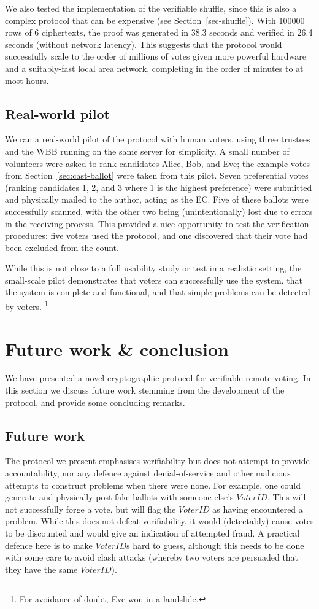 \documentclass[12pt,a4paper]{article}
\theoremstyle{definition}
\newcommand{\VoterID}{\mathit{VoterID}}
\begin{document}
We also tested the implementation of the verifiable shuffle, since this is also a complex protocol that can be expensive (see Section~\ref{sec-shuffle}). With 100000 rows of 6 ciphertexts, the proof was generated in 38.3 seconds and verified in 26.4 seconds (without network latency). This suggests that the protocol would successfully scale to the order of millions of votes given more powerful hardware and a suitably-fast local area network, completing in the order of minutes to at most hours.

\subsection{Real-world pilot}
We ran a real-world pilot of the protocol with human voters, using three trustees and the WBB running on the same server for simplicity. A small number of volunteers were asked to rank candidates Alice, Bob, and Eve; the example votes from Section~\ref{sec:cast-ballot} were taken from this pilot. Seven preferential votes (ranking candidates 1, 2, and 3 where 1 is the highest preference) were submitted and physically mailed to the author, acting as the EC. Five of these ballots were successfully scanned, with the other two being (unintentionally) lost due to errors in the receiving process. This provided a nice opportunity to test the verification procedures: five voters used the protocol, and one discovered that their vote had been excluded from the count.

While this is not close to a full usability study or test in a realistic setting, the small-scale pilot demonstrates that voters can successfully use the system, that the system is complete and functional, and that simple problems can be detected by voters.
\footnote{For avoidance of doubt, Eve won in a landslide.}
\newpage
\section{Future work \& conclusion}\label{sec-conclusion}
We have presented a novel cryptographic protocol for verifiable remote voting. In this section we discuss future work stemming from the development of the protocol, and provide some concluding remarks.
\subsection{Future work}
The protocol we present emphasises verifiability but does not attempt to provide accountability, nor any defence against denial-of-service and other malicious attempts to construct problems when there were none. For example, one could generate and physically post fake ballots with someone else's $\VoterID$. This will not successfully forge a vote, but will flag the $\VoterID$ as having encountered a problem. While this does not defeat verifiability, it would (detectably) cause votes to be discounted and would give an indication of attempted fraud. A practical defence here is to make $\VoterID$s hard to guess, although this needs to be done with some care to avoid clash attacks (whereby two voters are persuaded that they have the same $\VoterID$).
\end{document}
